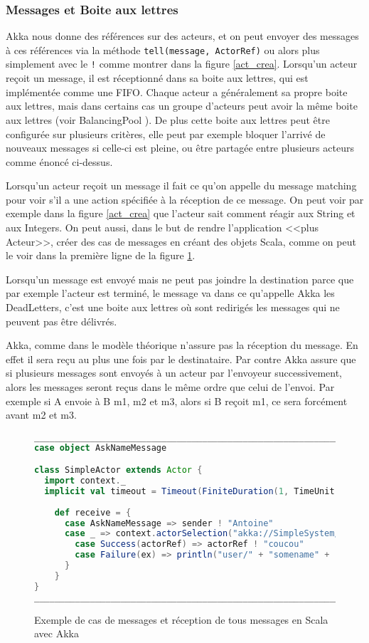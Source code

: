 \documentclass[11pt, a4paper]{article}
\begin{document}
\subsubsection{Messages et Boite aux lettres}
Akka nous donne des références sur des acteurs, et on peut envoyer des messages à ces références via la méthode \texttt{tell(message, ActorRef)} ou alors plus simplement avec le \texttt{!} comme montrer dans la figure \ref{act_crea}. Lorsqu'un acteur reçoit un message, il est réceptionné dans sa boite aux lettres, qui est implémentée comme une FIFO. Chaque acteur a généralement sa propre boite aux lettres, mais dans certains cas un groupe d'acteurs peut avoir la même boite aux lettres (voir BalancingPool \cite{akka}). De plus cette boite aux lettres peut être configurée sur plusieurs critères, elle peut par exemple bloquer l'arrivé de nouveaux messages si celle-ci est pleine, ou être partagée entre plusieurs acteurs comme énoncé ci-dessus.
\par Lorsqu'un acteur reçoit un message il fait ce qu'on appelle du message matching pour voir s'il a une action spécifiée à la réception de ce message. On peut voir par exemple dans la figure \ref{act_crea} que l'acteur sait comment réagir aux String et aux Integers. On peut aussi, dans le but de rendre l'application <<plus Acteur>>, créer des cas de messages en créant des objets Scala, comme on peut le voir dans la première ligne de la figure \ref{cas_mesg}.
\par Lorsqu'un message est envoyé mais ne peut pas joindre la destination parce que par exemple l'acteur est terminé, le message va dans ce qu'appelle Akka les DeadLetters, c'est une boite aux lettres où sont redirigés les messages qui ne peuvent pas être délivrés.
\par Akka, comme dans le modèle théorique n'assure pas la réception du message. En effet il sera reçu au plus une fois par le destinataire. Par contre Akka assure que si plusieurs messages sont envoyés à un acteur par l'envoyeur successivement, alors les messages seront reçus dans le même ordre que celui de l'envoi. Par exemple si A envoie à B m1, m2 et m3, alors si B reçoit m1, ce sera forcément avant m2 et m3.
\newline

\begin{figure}[ht]
\centering
\begin{lstlisting}[language=scala]
__________________________________________________________________________
case object AskNameMessage

class SimpleActor extends Actor {
  import context._
  implicit val timeout = Timeout(FiniteDuration(1, TimeUnit.SECONDS))
  
	def receive = {
	  case AskNameMessage => sender ! "Antoine"
	  case _ => context.actorSelection("akka://SimpleSystem/user/SimpleActor2").resolveOne().onComplete {
	    case Success(actorRef) => actorRef ! "coucou"
	    case Failure(ex) => println("user/" + "somename" + " does not exist")
	  }
	}
}
__________________________________________________________________________
\end{lstlisting}
\caption{Exemple de cas de messages et réception de tous messages en Scala avec Akka}
\label{cas_mesg}
\end{figure}
\end{document}
